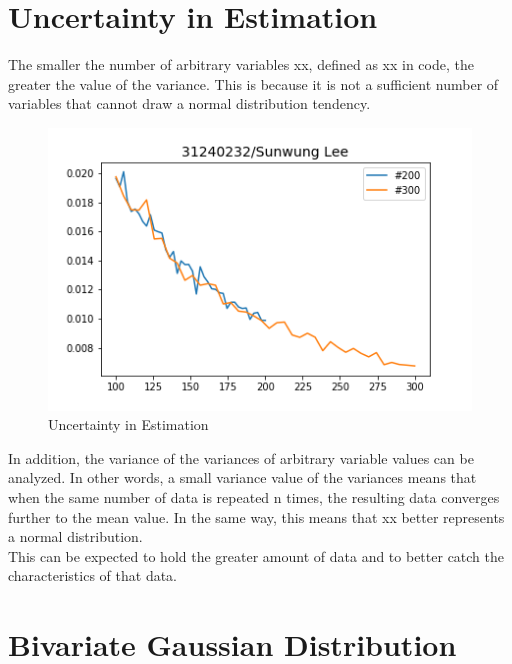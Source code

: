 \documentclass[letterpaper, 11pt]{article}
\begin{document}
\section{Uncertainty in Estimation}

The smaller the number of arbitrary variables xx, defined as xx in code, the greater the value of the variance. This is because it is not a sufficient number of variables that cannot draw a normal distribution tendency.
\begin{figure}[h] %

\begin{center}

\includegraphics[width=0.5\linewidth]{3_Uncertainty_in_Estimation.png}
\caption{Uncertainty in Estimation}
\end{center}
\end{figure}
In addition, the variance of the variances of arbitrary variable values can be analyzed. In other words, a small variance value of the variances means that when the same number of data is repeated n times, the resulting data converges further to the mean value. In the same way, this means that xx better represents a normal distribution. \\
This can be expected to hold the greater amount of data and to better catch the characteristics of that data.

 

\section{Bivariate Gaussian Distribution}
\end{document}
